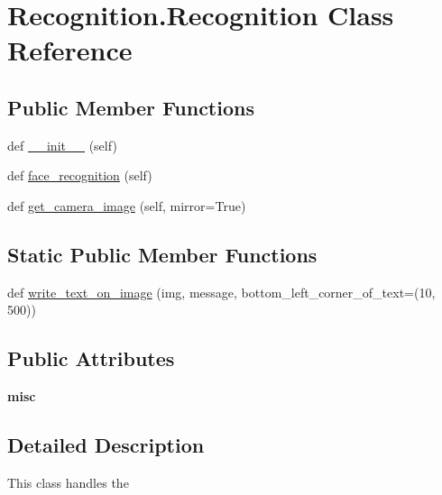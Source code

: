 \hypertarget{class_recognition_1_1_recognition}{}\section{Recognition.\+Recognition Class Reference}
\label{class_recognition_1_1_recognition}
\subsection*{Public Member Functions}
\begin{DoxyCompactItemize}
\item 
def \mbox{\hyperlink{class_recognition_1_1_recognition_a2f7707bf1fc057ae30c41baefbd7bf38}{\+\_\+\+\_\+init\+\_\+\+\_\+}} (self)
\item 
def \mbox{\hyperlink{class_recognition_1_1_recognition_a8c3d9ab0e9c708246660b8a6300eb852}{face\+\_\+recognition}} (self)
\item 
def \mbox{\hyperlink{class_recognition_1_1_recognition_afc5b62b531c4e2c6c5fef2c9a9e1b0c8}{get\+\_\+camera\+\_\+image}} (self, mirror=True)
\end{DoxyCompactItemize}
\subsection*{Static Public Member Functions}
\begin{DoxyCompactItemize}
\item 
def \mbox{\hyperlink{class_recognition_1_1_recognition_a5b3081b9a48c136f1397cd17dce89c37}{write\+\_\+text\+\_\+on\+\_\+image}} (img, message, bottom\+\_\+left\+\_\+corner\+\_\+of\+\_\+text=(10, 500))
\end{DoxyCompactItemize}
\subsection*{Public Attributes}
\begin{DoxyCompactItemize}
\item 
\mbox{\label{class_recognition_1_1_recognition_a6b6d17e10f916f8a158eaef600005bbc}} 
{\bfseries misc}
\end{DoxyCompactItemize}


\subsection{Detailed Description}
\begin{DoxyVerb}This class handles the
\end{DoxyVerb}
 

